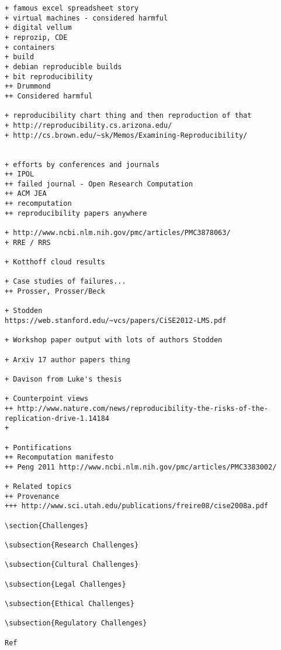 \documentclass[11pt]{article}
\begin{document}
\begin{verbatim}
+ famous excel spreadsheet story
+ virtual machines - considered harmful 
+ digital vellum
+ reprozip, CDE
+ containers
+ build 
+ debian reproducible builds
+ bit reproducibility
++ Drummond
++ Considered harmful

+ reproducibility chart thing and then reproduction of that
+ http://reproducibility.cs.arizona.edu/
+ http://cs.brown.edu/~sk/Memos/Examining-Reproducibility/


+ efforts by conferences and journals 
++ IPOL
++ failed journal - Open Research Computation
++ ACM JEA
++ recomputation
++ reproducibility papers anywhere

+ http://www.ncbi.nlm.nih.gov/pmc/articles/PMC3878063/
+ RRE / RRS 

+ Kotthoff cloud results

+ Case studies of failures...
++ Prosser, Prosser/Beck

+ Stodden 
https://web.stanford.edu/~vcs/papers/CiSE2012-LMS.pdf

+ Workshop paper output with lots of authors Stodden 

+ Arxiv 17 author papers thing 

+ Davison from Luke's thesis

+ Counterpoint views
++ http://www.nature.com/news/reproducibility-the-risks-of-the-replication-drive-1.14184
+ 

+ Pontifications
++ Recomputation manifesto
++ Peng 2011 http://www.ncbi.nlm.nih.gov/pmc/articles/PMC3383002/

+ Related topics
++ Provenance 
+++ http://www.sci.utah.edu/publications/freire08/cise2008a.pdf

\section{Challenges}

\subsection{Research Challenges}

\subsection{Cultural Challenges}

\subsection{Legal Challenges}

\subsection{Ethical Challenges}

\subsection{Regulatory Challenges}

Ref



\end{verbatim}
\end{document}
